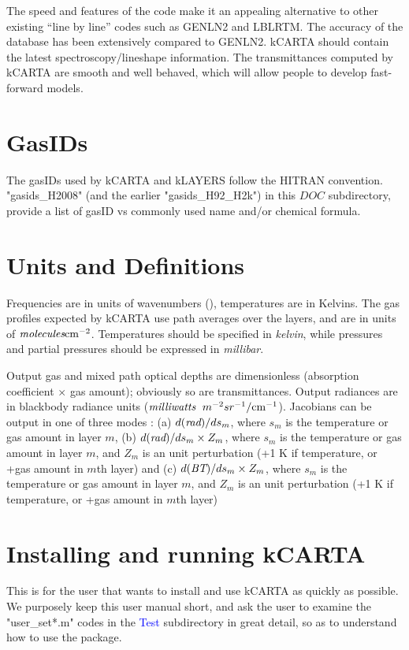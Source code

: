 \documentclass[12pt]{article}
\newcommand{\kc}{\textsf{kCARTA}\xspace}
\newcommand{\kl}{\textsf{kLAYERS}\xspace}
\newcommand{\cm}{\hbox{cm}}
\begin{document}
The speed and features of the code make it an appealing alternative to other
existing ``line by line'' codes such as {\sf GENLN2} and {\sf LBLRTM}.
The accuracy of the database has been extensively compared to {\sf
  GENLN2}.  \kc should contain the latest spectroscopy/lineshape information. 
The transmittances computed by \kc are smooth and well behaved, which 
will allow people to develop fast-forward models.

\section{GasIDs}
The gasIDs used by \kc and \kl follow the HITRAN convention. "gasids\_H2008" 
(and the earlier "gasids\_H92\_H2k") in this $DOC$ subdirectory, provide a list
of gasID vs commonly used name and/or chemical formula.

\section{Units and Definitions}

Frequencies are in units of wavenumbers (\wn), temperatures are in Kelvins. 
The gas profiles expected by \kc use path averages over the layers, and are 
in units of $\hbox{\em molecules} \cm^{-2}$.  Temperatures should be
specified in {\em kelvin}, while pressures and partial pressures
should be expressed in {\em millibar}. 

Output gas and mixed path optical depths are dimensionless (absorption
coefficient $\times$ gas amount); obviously so are transmittances.
Output radiances are in blackbody radiance units ($\hbox{\em milliwatts}
\;\ m^{-2} sr^{-1}/\cm^{-1}$).  Jacobians can be output in one of three
modes : (a) $d(\hbox{\em rad})/ds_{m}$, where $s_{m}$ is the temperature or 
gas amount in layer $m$, (b) $d(\hbox{\em rad})/ds_{m} \times Z_{m}$, 
where $s_{m}$ is the temperature or gas amount in layer $m$, and $Z_{m}$ is 
an unit perturbation (+1 K if temperature, or +gas amount in $m$th layer) and
(c) $d(\hbox{\em BT})/ds_{m} \times Z_{m}$, where $s_{m}$ is the temperature 
or gas amount in layer $m$, and $Z_{m}$ is an unit perturbation (+1 K if 
temperature, or +gas amount in $m$th layer)

\section{Installing and running \kc}
This is for the user that wants to install and use \kc as quickly as possible. 
We purposely keep this user manual short, and ask the user to 
examine the "user\_set*.m" codes in the \textcolor{blue}{Test} subdirectory 
in great detail, so as to understand how to use the package. 
\end{document}
